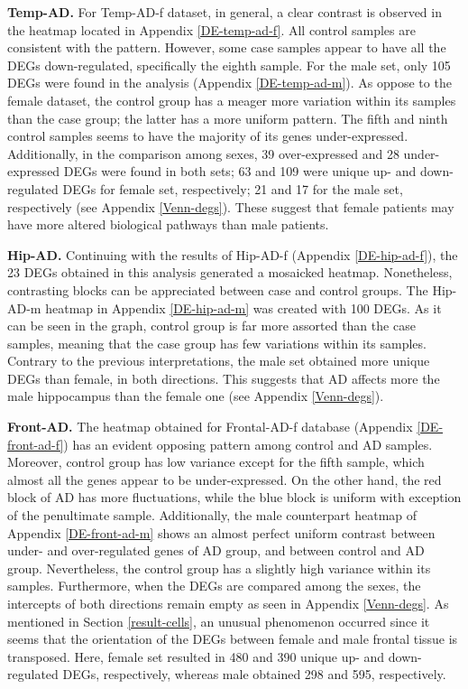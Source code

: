 \textbf{Temp-AD.} For Temp-AD-f dataset, in general, a clear contrast is observed in the heatmap located in Appendix \ref{DE-temp-ad-f}. All control samples are consistent with the pattern. However, some case samples appear to have all the DEGs down-regulated, specifically the eighth sample. For the male set, only 105 DEGs were found in the analysis (Appendix \ref{DE-temp-ad-m}). As oppose to the female dataset, the control group has a meager more variation within its samples than the case group; the latter has a more uniform pattern. The fifth and ninth control samples seems to have the majority of its genes under-expressed. Additionally, in the comparison among sexes, 39 over-expressed and 28 under-expressed DEGs were found in both sets; 63 and 109 were unique up- and down-regulated DEGs for female set, respectively; 21 and 17 for the male set, respectively (see Appendix \ref{Venn-degs}). These suggest that female patients may have more altered biological pathways than male patients.

\textbf{Hip-AD.} Continuing with the results of Hip-AD-f (Appendix \ref{DE-hip-ad-f}), the 23 DEGs obtained in this analysis generated a mosaicked heatmap. Nonetheless, contrasting blocks can be appreciated between case and control groups. The Hip-AD-m heatmap in Appendix \ref{DE-hip-ad-m} was created with 100 DEGs. As it can be seen in the graph, control group is far more assorted than the case samples, meaning that the case group has few variations within its samples. Contrary to the previous interpretations, the male set obtained more unique DEGs than female, in both directions. This suggests that AD affects more the male hippocampus than the female one (see Appendix \ref{Venn-degs}).

\textbf{Front-AD.} The heatmap obtained for Frontal-AD-f database (Appendix \ref{DE-front-ad-f}) has an evident opposing pattern among control and AD samples. Moreover, control group has low variance except for the fifth sample, which almost all the genes appear to be under-expressed. On the other hand, the red block of AD has more fluctuations, while the blue block is uniform with exception of the penultimate sample. Additionally, the male counterpart heatmap of Appendix \ref{DE-front-ad-m} shows an almost perfect uniform contrast between under- and over-regulated genes of AD group, and between control and AD group. Nevertheless, the control group has a slightly high variance within its samples. Furthermore, when the DEGs are compared among the sexes, the intercepts of both directions remain empty as seen in Appendix \ref{Venn-degs}. As mentioned in Section \ref{result-cells}, an unusual phenomenon occurred since it seems that the orientation of the DEGs between female and male frontal tissue is transposed. Here, female set resulted in 480 and 390 unique up- and down-regulated DEGs, respectively, whereas male obtained 298 and 595, respectively.

